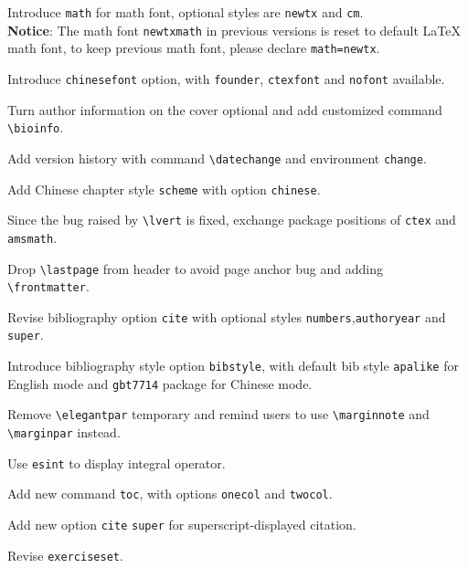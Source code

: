 \documentclass[11pt]{elegantbook}
\begin{document}
\begin{change}
  \item Introduce \lstinline{math} for math font, optional styles are \lstinline{newtx} and \lstinline{cm}.\\
  \textbf{Notice}: The math font \lstinline{newtxmath} in previous versions is reset to default \LaTeX{} math font, to keep previous math font, please declare \lstinline{math=newtx}.
  \item Introduce \lstinline{chinesefont} option, with \lstinline{founder}, \lstinline{ctexfont} and \lstinline{nofont} available.
  \item Turn author information on the cover optional and add customized command \lstinline{\bioinfo}.
  \item Add version history with command \lstinline{\datechange} and environment \lstinline{change}.
  \item Add Chinese chapter style \lstinline{scheme} with option \lstinline{chinese}.
  \item Since the bug raised by \lstinline{\lvert} is fixed, exchange package positions of \lstinline{ctex} and \lstinline{amsmath}.
  \item Drop \lstinline{\lastpage} from header to avoid page anchor bug and adding \lstinline{\frontmatter}.
  \item Revise bibliography option \lstinline{cite} with optional styles \lstinline{numbers},\lstinline{authoryear} and \lstinline{super}.
  \item Introduce bibliography style option \lstinline{bibstyle}, with default bib style \lstinline{apalike} for English mode and \lstinline{gbt7714} package for Chinese mode.
\end{change}


\begin{change}
  \item Remove \lstinline{\elegantpar} temporary and remind users to use \lstinline{\marginnote} and \lstinline{\marginpar} instead.
  \item Use \lstinline{esint} to display integral operator.
  \item Add new command \lstinline{toc}, with options  \lstinline{onecol} and \lstinline{twocol}.
  \item Add new option \lstinline{cite} \lstinline{super} for superscript-displayed citation.
  \item Revise \lstinline{exerciseset}.
\end{change}
\end{document}
